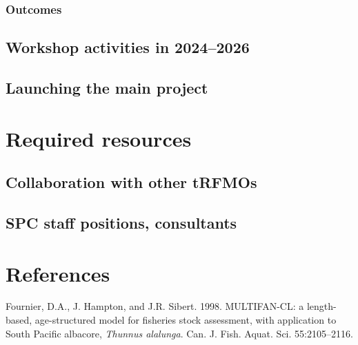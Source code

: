 \documentclass{SCreport}
\begin{document}
\subsubsection{Outcomes}

\subsection{Workshop activities in 2024--2026}

\subsection{Launching the main project}

\section{Required resources}

\subsection{Collaboration with other tRFMOs}

\subsection{SPC staff positions, consultants}

\section{References}

\sloppy\setlength{}

\begin{description}\setlength\itemsep{0ex}
  \item Fournier, D.A., J. Hampton, and J.R. Sibert. 1998. MULTIFAN-CL: a
  length-based, age-structured model for fisheries stock assessment, with
  application to South Pacific albacore, \textit{Thunnus alalunga}. Can. J.
  Fish. Aquat. Sci. 55:2105--2116.
\end{description}
\end{document}
